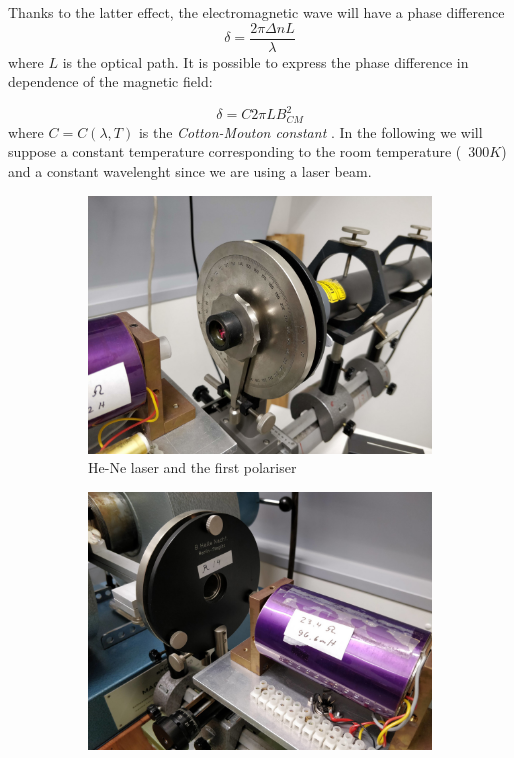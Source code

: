 \documentclass[11pt,a4paper]{article}
\begin{document}
Thanks to the latter effect, the electromagnetic wave will have a phase difference
\begin{equation}\label{eq:optical_phase}
\delta=\frac{2\pi \Delta n L}{\lambda}
\end{equation}
where $L$ is the optical path. It is possible to express the phase difference in dependence of the magnetic field:

\begin{equation}\label{eq:CME}
\delta=C2\pi L B_{CM}^2
\end{equation}
where $C=C(\lambda,T)$ is the \emph{Cotton-Mouton constant} \cite{wilson1997simple}. In the following we will suppose a constant temperature corresponding to the room temperature (~$300K$) and a constant wavelenght since we are using a laser beam.

\begin{figure}[H]
\centering
\begin{subfigure}[b]{0.45\textwidth}
\includegraphics[width=\textwidth]{laser_polariser}
\caption{He-Ne laser and the first polariser}
\label{fig:exp_setup_laser}
\end{subfigure}
\begin{subfigure}[b]{0.45\textwidth}
\includegraphics[width=\textwidth]{Faraday_compensator_quarter_plate}

\end{subfigure}
\end{figure}
\end{document}

